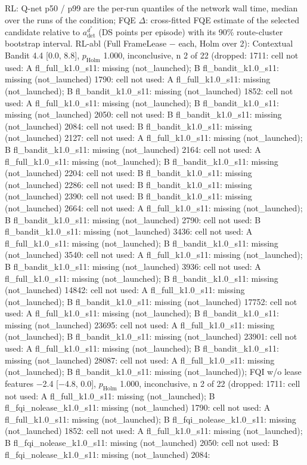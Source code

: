 \begin{table}[t]
{RL: Q-net p50 / p99 are the per-run quantiles of the network wall time, median over the runs of the condition; FQE $\Delta$: cross-fitted FQE estimate of the selected candidate relative to $a_\mathrm{det}^{d^*}$ (DS points per episode) with its 90\% route-cluster bootstrap interval. RL-abl (Full FrameLease $-$ each, Holm over 2): Contextual Bandit 4.4 [0.0, 8.8], $p_\mathrm{Holm}$ 1.000, inconclusive, n 2 of 22 (dropped: 1711: cell not used: A fl\_full\_k1.0\_s11: missing (not\_launched); B fl\_bandit\_k1.0\_s11: missing (not\_launched) \textbar{} 1790: cell not used: A fl\_full\_k1.0\_s11: missing (not\_launched); B fl\_bandit\_k1.0\_s11: missing (not\_launched) \textbar{} 1852: cell not used: A fl\_full\_k1.0\_s11: missing (not\_launched); B fl\_bandit\_k1.0\_s11: missing (not\_launched) \textbar{} 2050: cell not used: B fl\_bandit\_k1.0\_s11: missing (not\_launched) \textbar{} 2084: cell not used: B fl\_bandit\_k1.0\_s11: missing (not\_launched) \textbar{} 2127: cell not used: A fl\_full\_k1.0\_s11: missing (not\_launched); B fl\_bandit\_k1.0\_s11: missing (not\_launched) \textbar{} 2164: cell not used: A fl\_full\_k1.0\_s11: missing (not\_launched); B fl\_bandit\_k1.0\_s11: missing (not\_launched) \textbar{} 2204: cell not used: B fl\_bandit\_k1.0\_s11: missing (not\_launched) \textbar{} 2286: cell not used: B fl\_bandit\_k1.0\_s11: missing (not\_launched) \textbar{} 2390: cell not used: B fl\_bandit\_k1.0\_s11: missing (not\_launched) \textbar{} 2664: cell not used: A fl\_full\_k1.0\_s11: missing (not\_launched); B fl\_bandit\_k1.0\_s11: missing (not\_launched) \textbar{} 2790: cell not used: B fl\_bandit\_k1.0\_s11: missing (not\_launched) \textbar{} 3436: cell not used: A fl\_full\_k1.0\_s11: missing (not\_launched); B fl\_bandit\_k1.0\_s11: missing (not\_launched) \textbar{} 3540: cell not used: A fl\_full\_k1.0\_s11: missing (not\_launched); B fl\_bandit\_k1.0\_s11: missing (not\_launched) \textbar{} 3936: cell not used: A fl\_full\_k1.0\_s11: missing (not\_launched); B fl\_bandit\_k1.0\_s11: missing (not\_launched) \textbar{} 14842: cell not used: A fl\_full\_k1.0\_s11: missing (not\_launched); B fl\_bandit\_k1.0\_s11: missing (not\_launched) \textbar{} 17752: cell not used: A fl\_full\_k1.0\_s11: missing (not\_launched); B fl\_bandit\_k1.0\_s11: missing (not\_launched) \textbar{} 23695: cell not used: A fl\_full\_k1.0\_s11: missing (not\_launched); B fl\_bandit\_k1.0\_s11: missing (not\_launched) \textbar{} 23901: cell not used: A fl\_full\_k1.0\_s11: missing (not\_launched); B fl\_bandit\_k1.0\_s11: missing (not\_launched) \textbar{} 28087: cell not used: A fl\_full\_k1.0\_s11: missing (not\_launched); B fl\_bandit\_k1.0\_s11: missing (not\_launched)); FQI w/o lease features $-$2.4 [$-$4.8, 0.0], $p_\mathrm{Holm}$ 1.000, inconclusive, n 2 of 22 (dropped: 1711: cell not used: A fl\_full\_k1.0\_s11: missing (not\_launched); B fl\_fqi\_nolease\_k1.0\_s11: missing (not\_launched) \textbar{} 1790: cell not used: A fl\_full\_k1.0\_s11: missing (not\_launched); B fl\_fqi\_nolease\_k1.0\_s11: missing (not\_launched) \textbar{} 1852: cell not used: A fl\_full\_k1.0\_s11: missing (not\_launched); B fl\_fqi\_nolease\_k1.0\_s11: missing (not\_launched) \textbar{} 2050: cell not used: B fl\_fqi\_nolease\_k1.0\_s11: missing (not\_launched) \textbar{} 2084: }
\end{table}

